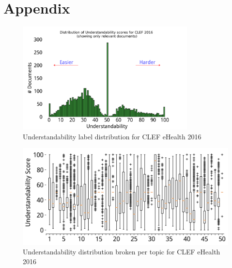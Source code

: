 \documentclass[10pt,a4paper]{article}
\begin{document}
	

\section*{Appendix} 
\label{chp:appendix}


\begin{figure}[h!]
	\centering
	\includegraphics[width=0.8\textwidth]{appendix/hist_unders16.png}
    \caption{Understandability label distribution for CLEF eHealth 2016}
	\label{fig:dist}
\end{figure}

\begin{figure}[h!]
	\centering
	\includegraphics[width=.8\textwidth]{appendix/unders_per_topic_clef16.png}
    \caption{Understandability distribution broken per topic for CLEF eHealth 2016}
	\label{fig:dist}
\end{figure}
\end{document}

